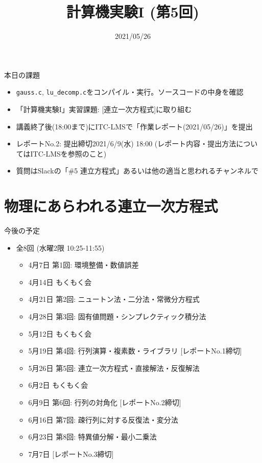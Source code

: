\documentclass[10pt,dvipdfmx]{beamer}
\title{計算機実験I (第5回)}
\date{2021/05/26}
\begin{document}
\begin{frame}
  \titlepage
  \tableofcontents
\end{frame}

\begin{frame}[t]{本日の課題}
  \begin{itemize}
  \item {\tt gauss.c}, {\tt lu\_decomp.c}をコンパイル・実行。ソースコードの中身を確認
  \item 「計算機実験I」実習課題: [連立一次方程式]に取り組む
  \item 講義終了後(18:00まで)にITC-LMSで「作業レポート(2021/05/26)」を提出
  \item レポートNo.2: 提出締切2021/6/9(水) 18:00 (レポート内容・提出方法についてはITC-LMSを参照のこと)
  \item 質問はSlackの「\#5 連立方程式」あるいは他の適当と思われるチャンネルで
  \end{itemize}
\end{frame}

\section{物理にあらわれる連立一次方程式}








\begin{frame}[t]{今後の予定}
  \begin{itemize}
  \item 全8回 (水曜2限 10:25-11:55)
    \begin{itemize}
    \item {\color{gray} 4月7日 第1回: 環境整備・数値誤差}
    \item {\color{gray} 4月14日 もくもく会}
    \item {\color{gray} 4月21日 第2回: ニュートン法・二分法・常微分方程式}
    \item {\color{gray} 4月28日 第3回: 固有値問題・シンプレクティック積分法}
    \item {\color{gray} 5月12日 もくもく会}
    \item {\color{gray} 5月19日 第4回: 行列演算・複素数・ライブラリ [レポートNo.1締切]}
    \item {\color{gray} 5月26日 第5回: 連立一次方程式・直接解法・反復解法}
    \item 6月2日 もくもく会
    \item 6月9日 第6回: 行列の対角化 [レポートNo.2締切]
    \item 6月16日 第7回: 疎行列に対する反復法・変分法
    \item 6月23日 第8回: 特異値分解・最小二乗法
    \item 7月7日 [レポートNo.3締切]
     \end{itemize}
  \end{itemize}
\end{frame}
\end{document}
